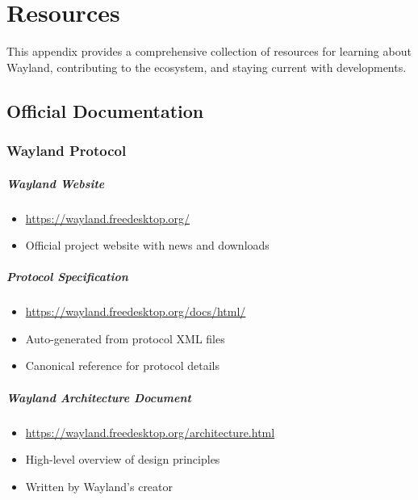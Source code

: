
\chapter{Resources}
\label{appendix:resources}

This appendix provides a comprehensive collection of resources for learning about Wayland, contributing to the ecosystem, and staying current with developments.

\section{Official Documentation}

\subsection{Wayland Protocol}

\paragraph{Wayland Website}
\begin{itemize}
    \item \url{https://wayland.freedesktop.org/}
    \item Official project website with news and downloads
\end{itemize}

\paragraph{Protocol Specification}
\begin{itemize}
    \item \url{https://wayland.freedesktop.org/docs/html/}
    \item Auto-generated from protocol XML files
    \item Canonical reference for protocol details
\end{itemize}

\paragraph{Wayland Architecture Document}
\begin{itemize}
    \item \url{https://wayland.freedesktop.org/architecture.html}
    \item High-level overview of design principles
    \item Written by Wayland's creator
\end{itemize}

